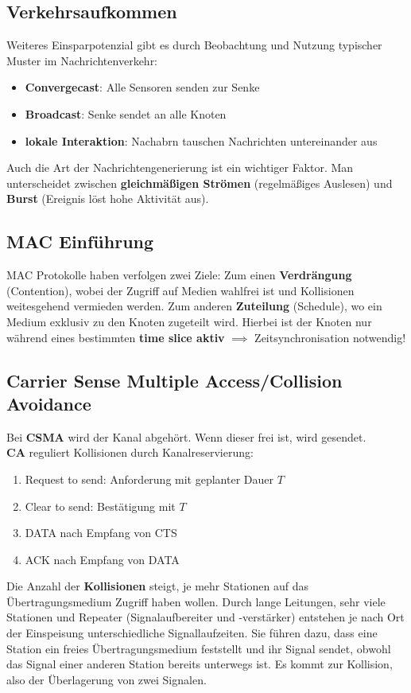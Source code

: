 \documentclass[a4paper]{article}
\begin{document}
\subsection{Verkehrsaufkommen}
Weiteres Einsparpotenzial gibt es durch Beobachtung und Nutzung typischer Muster im Nachrichtenverkehr:
\begin{itemize}
	\item \textbf{Convergecast}: Alle Sensoren senden zur Senke
	\item \textbf{Broadcast}: Senke sendet an alle Knoten
	\item \textbf{lokale Interaktion}: Nachabrn tauschen Nachrichten untereinander aus
\end{itemize}
Auch die Art der Nachrichtengenerierung ist ein wichtiger Faktor. Man unterscheidet zwischen \textbf{gleichmäßigen Strömen} (regelmäßiges Auslesen) und \textbf{Burst} (Ereignis löst hohe Aktivität aus).
\subsection{MAC Einführung}
MAC Protokolle haben verfolgen zwei Ziele: Zum einen \textbf{Verdrängung} (Contention), wobei der Zugriff auf Medien wahlfrei ist und Kollisionen weitesgehend vermieden werden. Zum anderen \textbf{Zuteilung} (Schedule), wo ein Medium exklusiv zu den Knoten zugeteilt wird. Hierbei ist der Knoten nur während eines bestimmten \textbf{time slice aktiv} $\implies$ Zeitsynchronisation notwendig!
\subsection{Carrier Sense Multiple Access/Collision Avoidance}
Bei \textbf{CSMA} wird der Kanal abgehört. Wenn dieser frei ist, wird gesendet.\\
\textbf{CA} reguliert Kollisionen durch Kanalreservierung:
\begin{enumerate}
	\item Request to send: Anforderung mit geplanter Dauer $T$
	\item Clear to send: Bestätigung mit $T$
	\item DATA nach Empfang von CTS
	\item ACK nach Empfang von DATA
\end{enumerate}
Die Anzahl der \textbf{Kollisionen} steigt, je mehr Stationen auf das Übertragungsmedium Zugriff haben wollen. Durch lange Leitungen, sehr viele Stationen und Repeater (Signalaufbereiter und -verstärker) entstehen je nach Ort der Einspeisung unterschiedliche Signallaufzeiten. Sie führen dazu, dass eine Station ein freies Übertragungsmedium feststellt und ihr Signal sendet, obwohl das Signal einer anderen Station bereits unterwegs ist. Es kommt zur Kollision, also der Überlagerung von zwei Signalen.\\
\end{document}
